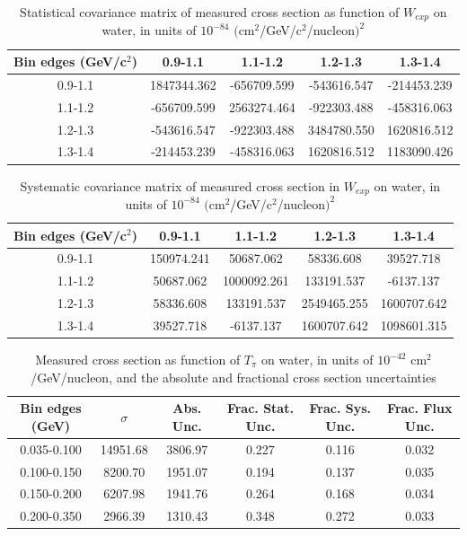 \documentclass[../main.tex]{subfiles}
\begin{document}
\begin{table}
  \centering
  \renewcommand{\arraystretch}{1.15}
  \caption{Statistical covariance matrix of measured cross section as function of $W_{exp}$ on water, in units of $10^{-84}$ $(\text{cm}^2$/GeV/c${}^2$/nucleon$)^2$}
    \begin{tabular}{c||cccc}
      Bin edges (GeV/c${}^2$) & 0.9-1.1 & 1.1-1.2 & 1.2-1.3 & 1.3-1.4\\
      \hline
      \hline
      0.9-1.1 & 1847344.362 & -656709.599 & -543616.547 & -214453.239\\
      1.1-1.2 & -656709.599 & 2563274.464 & -922303.488 & -458316.063\\
      1.2-1.3 & -543616.547 & -922303.488 & 3484780.550 & 1620816.512\\
      1.3-1.4 & -214453.239 & -458316.063 & 1620816.512 & 1183090.426
    \end{tabular}
  \label{tbl:statnucleonnuc10Wb}
\end{table}
\begin{table}
  \centering
  \renewcommand{\arraystretch}{1.15}
  \caption{Systematic covariance matrix of measured cross section in $W_{exp}$ on water, in units of $10^{-84}$ $(\text{cm}^2$/GeV/c${}^2$/nucleon$)^2$}
    \begin{tabular}{c||cccc}
      Bin edges (GeV/c${}^2$) & 0.9-1.1 & 1.1-1.2 & 1.2-1.3 & 1.3-1.4\\
      \hline
      \hline
      0.9-1.1 & 150974.241 & 50687.062 & 58336.608 & 39527.718\\
      1.1-1.2 & 50687.062 & 1000092.261 & 133191.537 & -6137.137\\
      1.2-1.3 & 58336.608 & 133191.537 & 2549465.255 & 1600707.642\\
      1.3-1.4 & 39527.718 & -6137.137 & 1600707.642 & 1098601.315
    \end{tabular}
  \label{tbl:sysnucleonnuc10Wc}
\end{table}
\pagebreak
\begin{turnpage}
\end{turnpage}
\begin{table}
  \centering
  \renewcommand{\arraystretch}{1.15}
  \caption{Measured cross section as function of $T_{\pi}$ on water, in units of $10^{-42}$ $\text{cm}^2$/GeV/nucleon, and the absolute and fractional cross section uncertainties}
    \begin{tabular}{c||c|c||c|c|c}
      Bin edges (GeV) &  $\sigma$  &  Abs. Unc.  &  Frac. Stat. Unc.  &  Frac. Sys. Unc.  &  Frac. Flux Unc. \\
      \hline
      \hline
      0.035-0.100 & 14951.68 & 3806.97 & 0.227 & 0.116 & 0.032\\
      0.100-0.150 & 8200.70 & 1951.07 & 0.194 & 0.137 & 0.035\\
      0.150-0.200 & 6207.98 & 1941.76 & 0.264 & 0.168 & 0.034\\
      0.200-0.350 & 2966.39 & 1310.43 & 0.348 & 0.272 & 0.033
    \end{tabular}
  \label{tbl:datanucleonnuc10pion_ekina}
\end{table}
\end{document}
